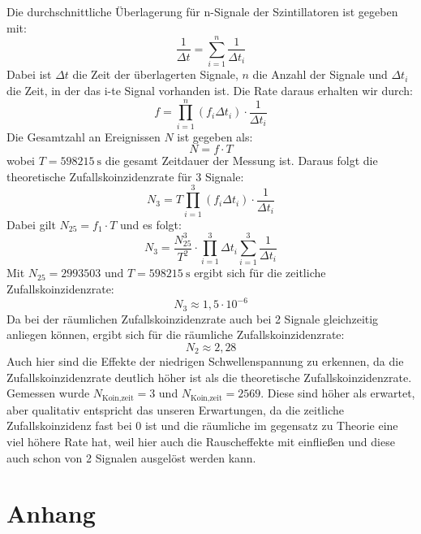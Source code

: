 \documentclass{article}
\begin{document}
Die durchschnittliche Überlagerung für n-Signale der Szintillatoren ist gegeben mit:
\begin{displaymath}
    \frac{1}{\Delta t}= \sum_{i=1}^{n} \frac{1}{\Delta t_i}
\end{displaymath}
Dabei ist $\Delta t$ die Zeit der überlagerten Signale, $n$ die Anzahl der Signale und $\Delta t_i$ die Zeit, in der das i-te Signal vorhanden ist.
Die Rate daraus erhalten wir durch:
\begin{displaymath}
    f=\prod_{i=1}^{n} (f_i \Delta t_i) \cdot \frac{1}{\Delta t_i}
\end{displaymath}
Die Gesamtzahl an Ereignissen $N$ ist gegeben als:
\begin{displaymath}
    N = f \cdot T
\end{displaymath}
wobei $T=\SI{598215}{\second}$ die gesamt Zeitdauer der Messung ist.
Daraus folgt die theoretische Zufallskoinzidenzrate für 3 Signale:
\begin{displaymath}
    N_3=T\prod_{i=1}^{3} (f_i \Delta t_i) \cdot \frac{1}{\Delta t_i}
\end{displaymath}
Dabei gilt $N_{25}=f_1 \cdot T$ und es folgt:
\begin{displaymath}
    N_3 = \frac{N_{25}^3}{T^2} \cdot \prod_{i=1}^{3} \Delta t_i \sum_{i=1}^{3}\frac{1}{\Delta t_i}
\end{displaymath}
Mit $N_{25}=2993503$ und $T=\SI{598215}{\second}$ ergibt sich für die zeitliche Zufallskoinzidenzrate:
\begin{displaymath}
    N_3 \approx 1,5 \cdot 10^{-6}    
\end{displaymath}
Da bei der räumlichen Zufallskoinzidenzrate auch bei 2 Signale gleichzeitig anliegen können, ergibt sich für die räumliche Zufallskoinzidenzrate:
\begin{displaymath}
    N_2 \approx 2,28
\end{displaymath}
Auch hier sind die Effekte der niedrigen Schwellenspannung zu erkennen, da die Zufallskoinzidenzrate deutlich höher ist als die theoretische Zufallskoinzidenzrate.
Gemessen wurde $N_\text{Koin,zeit}=3$ und $N_\text{Koin,zeit}=2569$.
Diese sind höher als erwartet, aber qualitativ entspricht das unseren Erwartungen, da die zeitliche Zufallskoinzidenz fast bei 0 ist und die räumliche im gegensatz zu Theorie eine viel höhere Rate hat, weil hier auch die
Rauscheffekte mit einfließen und diese auch schon von 2 Signalen ausgelöst werden kann.


\section{Anhang}
\end{document}
